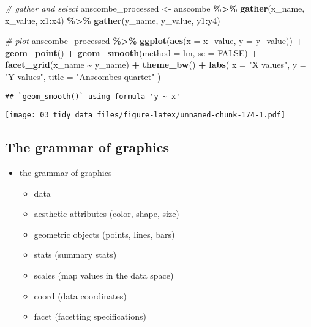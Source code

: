 \documentclass[
]{book}
\newenvironment{Shaded}{\begin{snugshade}}{\end{snugshade}}
\newcommand{\CommentTok}[1]{\textcolor[rgb]{0.56,0.35,0.01}{\textit{#1}}}
\newcommand{\DataTypeTok}[1]{\textcolor[rgb]{0.13,0.29,0.53}{#1}}
\newcommand{\KeywordTok}[1]{\textcolor[rgb]{0.13,0.29,0.53}{\textbf{#1}}}
\newcommand{\NormalTok}[1]{#1}
\newcommand{\OperatorTok}[1]{\textcolor[rgb]{0.81,0.36,0.00}{\textbf{#1}}}
\newcommand{\OtherTok}[1]{\textcolor[rgb]{0.56,0.35,0.01}{#1}}
\newcommand{\StringTok}[1]{\textcolor[rgb]{0.31,0.60,0.02}{#1}}
\providecommand{\tightlist}{%
  \setlength{\itemsep}{0pt}\setlength{\parskip}{0pt}}
\begin{document}
\begin{Shaded}
\begin{Highlighting}[]
\CommentTok{\# gather and select}
\NormalTok{anscombe\_processed \textless{}{-}}\StringTok{ }\NormalTok{anscombe }\OperatorTok{\%\textgreater{}\%}
\StringTok{  }\KeywordTok{gather}\NormalTok{(x\_name, x\_value, x1}\OperatorTok{:}\NormalTok{x4) }\OperatorTok{\%\textgreater{}\%}
\StringTok{  }\KeywordTok{gather}\NormalTok{(y\_name, y\_value, y1}\OperatorTok{:}\NormalTok{y4)}

\CommentTok{\# plot}
\NormalTok{anscombe\_processed }\OperatorTok{\%\textgreater{}\%}
\StringTok{  }\KeywordTok{ggplot}\NormalTok{(}\KeywordTok{aes}\NormalTok{(}\DataTypeTok{x =}\NormalTok{ x\_value, }\DataTypeTok{y =}\NormalTok{ y\_value)) }\OperatorTok{+}
\StringTok{  }\KeywordTok{geom\_point}\NormalTok{() }\OperatorTok{+}
\StringTok{  }\KeywordTok{geom\_smooth}\NormalTok{(}\DataTypeTok{method =}\NormalTok{ lm, }\DataTypeTok{se =} \OtherTok{FALSE}\NormalTok{) }\OperatorTok{+}
\StringTok{  }\KeywordTok{facet\_grid}\NormalTok{(x\_name }\OperatorTok{\textasciitilde{}}\StringTok{ }\NormalTok{y\_name) }\OperatorTok{+}
\StringTok{  }\KeywordTok{theme\_bw}\NormalTok{() }\OperatorTok{+}
\StringTok{  }\KeywordTok{labs}\NormalTok{(}
    \DataTypeTok{x =} \StringTok{"X values"}\NormalTok{,}
    \DataTypeTok{y =} \StringTok{"Y values"}\NormalTok{,}
    \DataTypeTok{title =} \StringTok{"Anscombe\textquotesingle{}s quartet"}
\NormalTok{  )}
\end{Highlighting}
\end{Shaded}

\begin{verbatim}
## `geom_smooth()` using formula 'y ~ x'
\end{verbatim}

\texttt{[image: 03\_tidy\_data\_files/figure-latex/unnamed-chunk-174-1.pdf]}

\hypertarget{the-grammar-of-graphics}{%
\subsection{The grammar of graphics}\label{the-grammar-of-graphics}}

\begin{itemize}
\item
  the grammar of graphics

  \begin{itemize}
  \tightlist
  \item
    data
  \item
    aesthetic attributes (color, shape, size)
  \item
    geometric objects (points, lines, bars)
  \item
    stats (summary stats)
  \item
    scales (map values in the data space)
  \item
    coord (data coordinates)
  \item
    facet (facetting specifications)
  \end{itemize}
\end{itemize}
\end{document}
